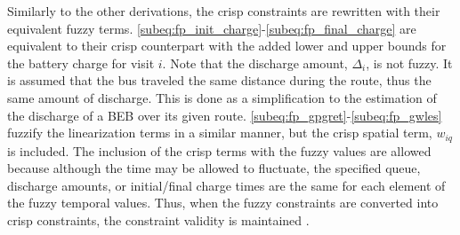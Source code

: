 \documentclass[ee,thesis]{usuthesis}
\begin{document}
\label{sec:fuzzy-charging-constraints}

Similarly to the other derivations, the crisp constraints are rewritten with their equivalent fuzzy terms.
\ref{subeq:fp_init_charge}-\ref{subeq:fp_final_charge} are equivalent to their crisp counterpart with the added lower
and upper bounds for the battery charge for visit \(i\). Note that the discharge amount, \(\Delta_i\), is not fuzzy. It is
assumed that the bus traveled the same distance during the route, thus the same amount of discharge. This is done as a
simplification to the estimation of the discharge of a BEB over its given route.
\ref{subeq:fp_gpgret}-\ref{subeq:fp_gwles} fuzzify the linearization terms in a similar manner, but the crisp spatial
term, \(w_{iq}\) is included. The inclusion of the crisp terms with the fuzzy values are allowed because although the time
may be allowed to fluctuate, the specified queue, discharge amounts, or initial/final charge times are the same for each
element of the fuzzy temporal values. Thus, when the fuzzy constraints are converted into crisp constraints, the
constraint validity is maintained \cite{ghanbari-2019-fuzzy}.
\end{document}
